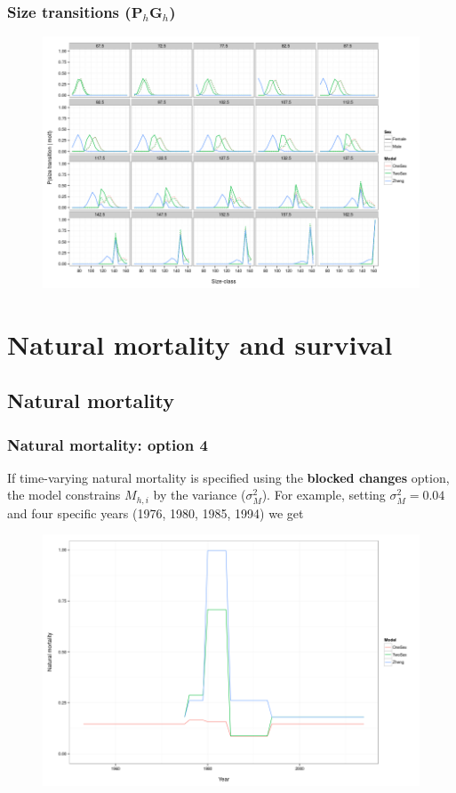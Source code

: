 \documentclass{beamer}
\begin{document}
\begin{frame}
\frametitle{Size transitions  ($\boldsymbol{P}_h \boldsymbol{G}_h$)}
\begin{figure}[!htbp]
  \centering
  \includegraphics[width=0.75\linewidth]{figure/size_trans-1.png}
\end{figure}
\end{frame}


\section{Natural mortality and survival}


\subsection{Natural mortality}
\begin{frame}
\frametitle{Natural mortality: option 4}
If time-varying natural mortality is specified using the {\bf blocked changes}
option, the model constrains $M_{h,i}$ by the variance ($\sigma^2_M$). For
example, setting $\sigma^2_M = 0.04$ and four specific years (1976, 1980, 1985,
1994) we get
\begin{figure}[!htbp]
  \centering
  \includegraphics[width=0.65\linewidth]{figure/natural_mortality-1.png}
\end{figure}
\end{frame}
\end{document}
